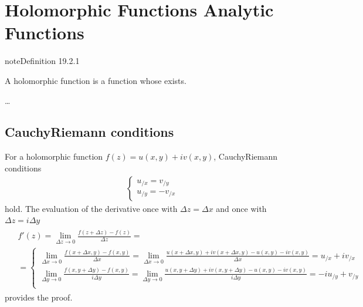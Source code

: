 \documentclass[letterpaper,10pt,english]{jupyterBook}
\begin{document}
\section{Holomorphic Functions \sphinxhyphen{} Analytic Functions}
\label{\detokenize{ch/complex/analysis:holomorphic-functions-analytic-functions}}\label{\detokenize{ch/complex/analysis:complex-analysis-holo-fun}}\label{ch/complex/analysis:definition-0}
\begin{sphinxadmonition}{note}{Definition 19.2.1}



\sphinxAtStartPar
A holomorphic function is a function whose {\hyperref[\detokenize{ch/complex/analysis:complex-analysis-fun-derivative}]{}} exists.
\end{sphinxadmonition}

\sphinxAtStartPar
{} …


\subsection{Cauchy\sphinxhyphen{}Riemann conditions}
\label{\detokenize{ch/complex/analysis:cauchy-riemann-conditions}}\label{\detokenize{ch/complex/analysis:complex-analysis-holo-fun-cauchy-riemann}}
\sphinxAtStartPar
For a holomorphic function \(f(z) = u(x,y) + i v(x,y)\), Cauchy\sphinxhyphen{}Riemann conditions
\begin{equation*}
\begin{split}\begin{cases}
u_{/x} = v_{/y} \\
u_{/y} = - v_{/x}
\end{cases}\end{split}
\end{equation*}
\sphinxAtStartPar
hold. The evaluation of the derivative once with \(\Delta z = \Delta x\) and once with \(\Delta z = i \Delta y\)
\begin{equation*}
\begin{split}\begin{aligned}
& f'(z) = \lim_{\Delta z \rightarrow 0} \frac{f(z+\Delta z) - f(z)}{\Delta z} = \\ 
& = \left\{
\begin{aligned}
  \lim_{\Delta x \rightarrow 0} \frac{f(x+\Delta x,y) - f(x,y)}{\Delta x} = \lim_{\Delta x \rightarrow 0} \frac{u(x+\Delta x,y) + i v(x+\Delta x,y) - u(x,y) - i v(x,y)}{\Delta x} = u_{/x} + i v_{/x} \\ 
  \lim_{\Delta y \rightarrow 0} \frac{f(x,y+\Delta y) - f(x,y)}{i \Delta y} = \lim_{\Delta y \rightarrow 0}  \frac{u(x,y+\Delta y) + i v(x,y+\Delta y) - u(x,y) - i v(x,y)}{i \Delta y} = -i u_{/y} + v_{/y} \\ 
\end{aligned}
\right.
\end{aligned}\end{split}
\end{equation*}
\sphinxAtStartPar
provides the proof.
\end{document}

